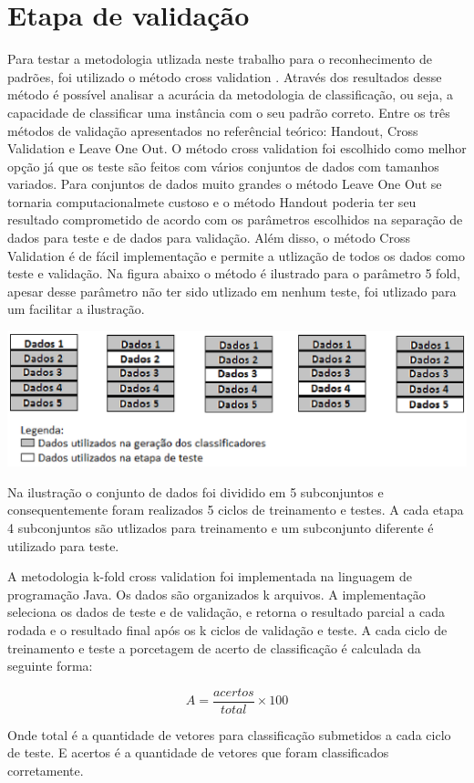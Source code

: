 \section{Etapa de validação}
Para testar a metodologia utlizada neste trabalho para o reconhecimento de padrões, foi utilizado o método cross validation \cite{Kohavi95Cross} \cite{Baldisserotto05Validacao}. Através dos resultados desse método é possível analisar a acurácia da metodologia de classificação, ou seja, a capacidade de classificar uma instância com o seu padrão correto.
Entre os três métodos de validação apresentados no referêncial teórico: Handout, Cross Validation e Leave One Out. O método cross validation foi escolhido como melhor opção já que os teste são feitos com vários conjuntos de dados com tamanhos variados. Para conjuntos de dados muito grandes o método Leave One Out se tornaria computacionalmete custoso e o método Handout poderia ter seu resultado comprometido de acordo com os parâmetros escolhidos na separação de dados para teste e de dados para validação. Além disso, o método Cross Validation é de fácil implementação e permite a utlização de todos os dados como teste e validação.
Na figura abaixo o método é ilustrado para o parâmetro 5 fold, apesar desse parâmetro não ter sido utlizado em nenhum teste, foi utlizado para um facilitar a ilustração. 
\begin{center}
	\includegraphics[scale=1.0]{graficos/cross_validation}
	\label{img:cross_validation}
\end{center}

Na ilustração o conjunto de dados foi dividido em 5 subconjuntos e consequentemente foram realizados 5 ciclos de treinamento e testes. A cada etapa 4 subconjuntos são utlizados para treinamento e um subconjunto diferente é utilizado para teste. 

A metodologia k-fold cross validation foi implementada na linguagem de programação Java. Os dados são organizados k arquivos. A implementação seleciona os dados de teste e de validação, e retorna o resultado parcial a cada rodada e o resultado final após os k ciclos de validação e teste. A cada ciclo de treinamento e teste a porcetagem de acerto de classificação é calculada da seguinte forma:

$$A = \frac{acertos}{total}\times 100$$

Onde total é a quantidade de vetores para classificação submetidos a cada ciclo de teste. E acertos é a quantidade de vetores que foram classificados corretamente.
